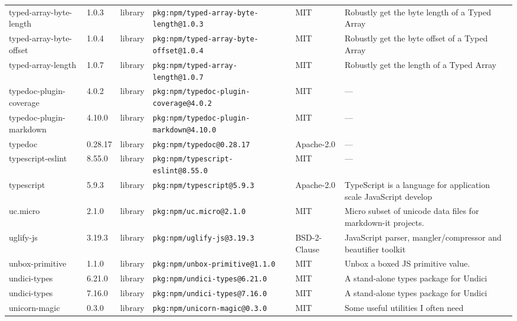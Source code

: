 \documentclass[11pt,a4paper]{article}
\begin{document}
\begin{longtable}{|p{4cm}|p{2cm}|p{1.6cm}|p{5cm}|p{1.5cm}|p{3.5cm}|}
\raggedright typed-array-byte-length & 1.0.3 & library & \small\texttt{pkg:npm/typed-array-byte-length@1.0.3} & MIT & \small Robustly get the byte length of a Typed Array \\
\raggedright typed-array-byte-offset & 1.0.4 & library & \small\texttt{pkg:npm/typed-array-byte-offset@1.0.4} & MIT & \small Robustly get the byte offset of a Typed Array \\
\raggedright typed-array-length & 1.0.7 & library & \small\texttt{pkg:npm/typed-array-length@1.0.7} & MIT & \small Robustly get the length of a Typed Array \\
\raggedright typedoc-plugin-coverage & 4.0.2 & library & \small\texttt{pkg:npm/typedoc-plugin-coverage@4.0.2} & MIT & \small — \\
\raggedright typedoc-plugin-markdown & 4.10.0 & library & \small\texttt{pkg:npm/typedoc-plugin-markdown@4.10.0} & MIT & \small — \\
\raggedright typedoc & 0.28.17 & library & \small\texttt{pkg:npm/typedoc@0.28.17} & Apache-2.0 & \small — \\
\raggedright typescript-eslint & 8.55.0 & library & \small\texttt{pkg:npm/typescript-eslint@8.55.0} & MIT & \small — \\
\raggedright typescript & 5.9.3 & library & \small\texttt{pkg:npm/typescript@5.9.3} & Apache-2.0 & \small TypeScript is a language for application scale JavaScript develop \\
\raggedright uc.micro & 2.1.0 & library & \small\texttt{pkg:npm/uc.micro@2.1.0} & MIT & \small Micro subset of unicode data files for markdown-it projects. \\
\raggedright uglify-js & 3.19.3 & library & \small\texttt{pkg:npm/uglify-js@3.19.3} & BSD-2-Clause & \small JavaScript parser, mangler/compressor and beautifier toolkit \\
\raggedright unbox-primitive & 1.1.0 & library & \small\texttt{pkg:npm/unbox-primitive@1.1.0} & MIT & \small Unbox a boxed JS primitive value. \\
\raggedright undici-types & 6.21.0 & library & \small\texttt{pkg:npm/undici-types@6.21.0} & MIT & \small A stand-alone types package for Undici \\
\raggedright undici-types & 7.16.0 & library & \small\texttt{pkg:npm/undici-types@7.16.0} & MIT & \small A stand-alone types package for Undici \\
\raggedright unicorn-magic & 0.3.0 & library & \small\texttt{pkg:npm/unicorn-magic@0.3.0} & MIT & \small Some useful utilities I often need \\

\end{longtable}
\end{document}
